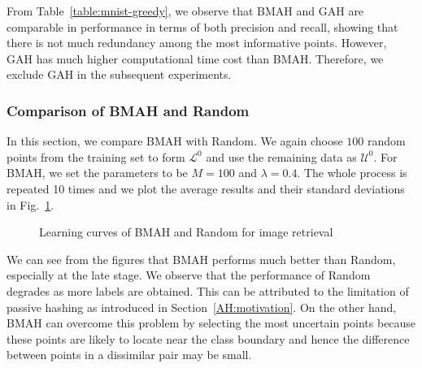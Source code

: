 From Table~\ref{table:mnist-greedy}, we observe that \mbox{BMAH} and \mbox{GAH} are comparable in performance in terms of both precision and recall, showing that there is not much redundancy among the most informative points. However, \mbox{GAH} has much higher computational time cost than \mbox{BMAH}. Therefore, we exclude \mbox{GAH} in the subsequent experiments.

\subsubsection{Comparison of \mbox{BMAH} and \mbox{Random}}

In this section, we compare \mbox{BMAH} with \mbox{Random}. We again choose $100$ random points from the training set to form $\mathcal{L}^{0}$ and use the remaining data as $\mathcal{U}^{0}$. For \mbox{BMAH}, we set the parameters to be $M = 100$ and $\lambda = 0.4$. The whole process is repeated 10 times and we plot the average results and their standard deviations in Fig.~\ref{fig:apt-largemnist-24b}.

\begin{figure}[htb]
\vspace{-1.5cm}
\caption{Learning curves of \mbox{BMAH} and \mbox{Random} for image retrieval}
\label{fig:apt-largemnist-24b}
\end{figure}

We can see from the figures that \mbox{BMAH} performs much better than \mbox{Random}, especially at the late stage. We observe that the performance of \mbox{Random} degrades as more labels are obtained. This can be attributed to the limitation of passive hashing as introduced in Section~\ref{AH:motivation}. On the other hand, \mbox{BMAH} can overcome this problem by selecting the most uncertain points because these points are likely to locate near the class boundary and hence the difference between points in a dissimilar pair may be small.


